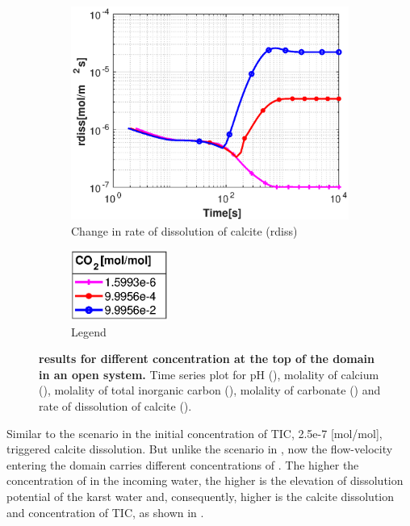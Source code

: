 \begin{figure}[!h]
\begin{subfigure}{.5\linewidth}
            \centering
        \includegraphics[width=\textwidth]{PICTURES/with_CO2_rdiss.eps}
        \caption{\small Change in rate of dissolution of calcite (rdiss)}
        \label{fig:CO2rdiss}
    \end{subfigure}%
    \hfill
    \begin{subfigure}{.5\linewidth}
            \centering
        \includegraphics[width=0.35\textwidth]{PICTURES/with_CO2_legend.eps}
        \caption{\small Legend}
        \label{fig:CO2legend}
    \end{subfigure}%
    \caption [\DuMuX results for different  concentration at the top of the domain in an open system.] {\textbf{\DuMuX results for different  
    concentration at the top of the domain in an open system.} \small Time series plot for 
    pH (), molality of calcium (), molality of total inorganic carbon (), 
    molality of carbonate () and rate of 
    dissolution of calcite ().}
    \label{fig:diffCO2}
\end{figure}

Similar to the scenario in  the initial concentration of TIC, 2.5e-7 [mol/mol], triggered calcite dissolution. 
But unlike the scenario in , now the flow-velocity entering the domain carries different concentrations of . 
The higher the concentration of  in the incoming water, the higher is the elevation of dissolution potential of the karst water and, consequently, higher is 
the calcite dissolution and concentration of TIC, as shown in . \\

